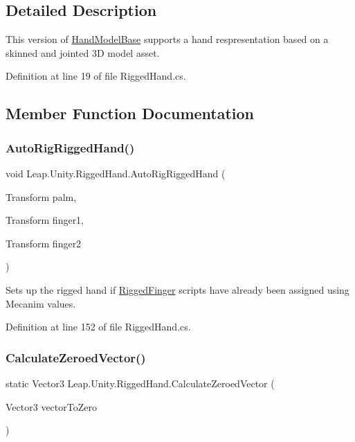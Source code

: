 \subsection{Detailed Description}
This version of \mbox{\hyperlink{class_leap_1_1_unity_1_1_hand_model_base}{Hand\+Model\+Base}} supports a hand respresentation based on a skinned and jointed 3D model asset. 

Definition at line 19 of file Rigged\+Hand.\+cs.



\subsection{Member Function Documentation}
\mbox{\label{class_leap_1_1_unity_1_1_rigged_hand_a919b4e3b967a79eb3bcce6d838a7ef4c}} 
\subsubsection{\texorpdfstring{AutoRigRiggedHand()}{AutoRigRiggedHand()}}
{\footnotesize\ttfamily void Leap.\+Unity.\+Rigged\+Hand.\+Auto\+Rig\+Rigged\+Hand (\begin{DoxyParamCaption}\item[{Transform}]{palm,  }\item[{Transform}]{finger1,  }\item[{Transform}]{finger2 }\end{DoxyParamCaption})}

Sets up the rigged hand if \mbox{\hyperlink{class_leap_1_1_unity_1_1_rigged_finger}{Rigged\+Finger}} scripts have already been assigned using Mecanim values. 

Definition at line 152 of file Rigged\+Hand.\+cs.

\mbox{\label{class_leap_1_1_unity_1_1_rigged_hand_a67e0012de184ea7ea1e76cec5a21589b}} 
\subsubsection{\texorpdfstring{CalculateZeroedVector()}{CalculateZeroedVector()}}
{\footnotesize\ttfamily static Vector3 Leap.\+Unity.\+Rigged\+Hand.\+Calculate\+Zeroed\+Vector (\begin{DoxyParamCaption}\item[{Vector3}]{vector\+To\+Zero }\end{DoxyParamCaption})\hspace{0.3cm}{\ttfamily [static]}}

